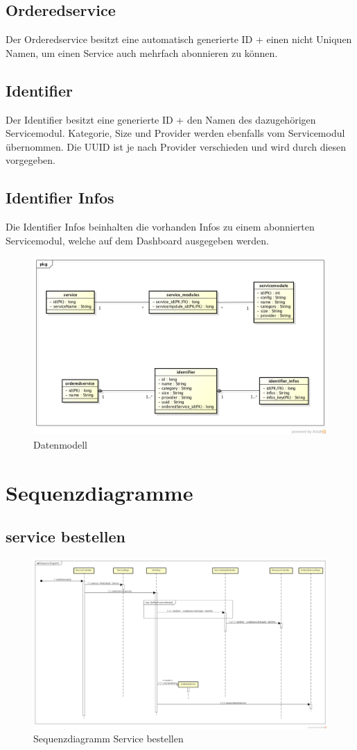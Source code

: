 \subsection{Orderedservice}
Der Orderedservice besitzt eine automatisch generierte ID + einen nicht Uniquen 
Namen, um einen Service auch mehrfach abonnieren zu können.

\subsection{Identifier}
Der Identifier besitzt eine generierte ID + den Namen des dazugehörigen 
Servicemodul.
Kategorie, Size und Provider werden ebenfalls vom Servicemodul übernommen.
Die \ac{UUID} ist je nach Provider verschieden und wird durch diesen vorgegeben.

\subsection{Identifier Infos}
Die Identifier Infos beinhalten die vorhanden Infos zu einem abonnierten 
Servicemodul, welche auf dem Dashboard ausgegeben werden.
\begin{figure}[!htbp]
\includegraphics[width=\textwidth]{./05_Design/04_Architektur/Datenmodell}
\caption{Datenmodell}
\end{figure}
\newpage
\section{Sequenzdiagramme}
\subsection{service bestellen}
\begin{figure}[!htbp]
\includegraphics[width=\textwidth]{./05_Design/04_Architektur/orderService}
\caption{Sequenzdiagramm Service bestellen}
\end{figure}
